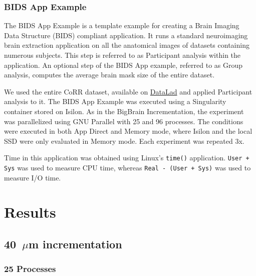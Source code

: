 \subsubsection{BIDS App Example}

The BIDS App Example is a template example for creating a Brain Imaging Data
Structure (BIDS) compliant application. It runs a standard neuroimaging brain
extraction application on all the anatomical images of datasets containing
numerous subjects. This step is referred to as Participant analysis within the
application. An optional step of the BIDS App example, referred to as Group
analysis, computes the average brain mask size of the entire dataset.

We used the entire CoRR dataset, available on
\href{https://www.datalad.org/}{DataLad} and applied Participant analysis to it.
The BIDS App Example was executed using a Singularity container stored on
Isilon. As in the BigBrain Incrementation, the experiment was parallelized using
GNU Parallel with 25 and 96 processes. The conditions were executed in both App
Direct and Memory mode, where Isilon and the local SSD were only evaluated in
Memory mode. Each experiment was repeated 3x.

Time in this application was obtained using Linux's \texttt{time()} application.
\texttt{User + Sys} was used to measure CPU time, whereas \texttt{Real - (User +
Sys)} was used to measure I/O time.
\section{Results}

\subsection{40~$\mu$m \bigbrain incrementation}
\subsubsection{25 Processes}



